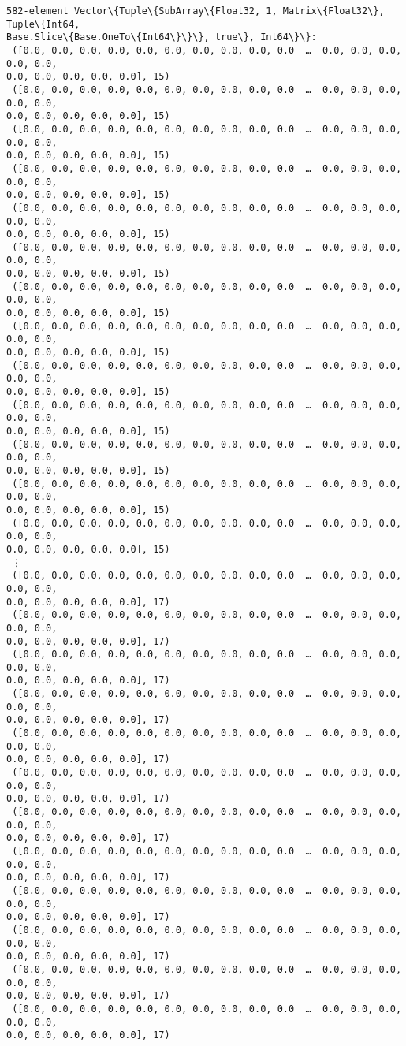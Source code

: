 \documentclass[11pt]{article}
\makeatletter
\newcommand{\boxspacing}{\kern\kvtcb@left@rule\kern\kvtcb@boxsep}
\newcommand{\prompt}[4]{
        {\ttfamily\llap{{\color{#2}[#3]:\hspace{3pt}#4}}\vspace{-\baselineskip}}
    }
\makeatother
\begin{document}
            \begin{tcolorbox}[breakable, size=fbox, boxrule=.5pt, pad at break*=1mm, opacityfill=0]
\prompt{Out}{outcolor}{160}{\boxspacing}
\begin{Verbatim}[commandchars=\\\{\}]
582-element Vector\{Tuple\{SubArray\{Float32, 1, Matrix\{Float32\}, Tuple\{Int64,
Base.Slice\{Base.OneTo\{Int64\}\}\}, true\}, Int64\}\}:
 ([0.0, 0.0, 0.0, 0.0, 0.0, 0.0, 0.0, 0.0, 0.0, 0.0  …  0.0, 0.0, 0.0, 0.0, 0.0,
0.0, 0.0, 0.0, 0.0, 0.0], 15)
 ([0.0, 0.0, 0.0, 0.0, 0.0, 0.0, 0.0, 0.0, 0.0, 0.0  …  0.0, 0.0, 0.0, 0.0, 0.0,
0.0, 0.0, 0.0, 0.0, 0.0], 15)
 ([0.0, 0.0, 0.0, 0.0, 0.0, 0.0, 0.0, 0.0, 0.0, 0.0  …  0.0, 0.0, 0.0, 0.0, 0.0,
0.0, 0.0, 0.0, 0.0, 0.0], 15)
 ([0.0, 0.0, 0.0, 0.0, 0.0, 0.0, 0.0, 0.0, 0.0, 0.0  …  0.0, 0.0, 0.0, 0.0, 0.0,
0.0, 0.0, 0.0, 0.0, 0.0], 15)
 ([0.0, 0.0, 0.0, 0.0, 0.0, 0.0, 0.0, 0.0, 0.0, 0.0  …  0.0, 0.0, 0.0, 0.0, 0.0,
0.0, 0.0, 0.0, 0.0, 0.0], 15)
 ([0.0, 0.0, 0.0, 0.0, 0.0, 0.0, 0.0, 0.0, 0.0, 0.0  …  0.0, 0.0, 0.0, 0.0, 0.0,
0.0, 0.0, 0.0, 0.0, 0.0], 15)
 ([0.0, 0.0, 0.0, 0.0, 0.0, 0.0, 0.0, 0.0, 0.0, 0.0  …  0.0, 0.0, 0.0, 0.0, 0.0,
0.0, 0.0, 0.0, 0.0, 0.0], 15)
 ([0.0, 0.0, 0.0, 0.0, 0.0, 0.0, 0.0, 0.0, 0.0, 0.0  …  0.0, 0.0, 0.0, 0.0, 0.0,
0.0, 0.0, 0.0, 0.0, 0.0], 15)
 ([0.0, 0.0, 0.0, 0.0, 0.0, 0.0, 0.0, 0.0, 0.0, 0.0  …  0.0, 0.0, 0.0, 0.0, 0.0,
0.0, 0.0, 0.0, 0.0, 0.0], 15)
 ([0.0, 0.0, 0.0, 0.0, 0.0, 0.0, 0.0, 0.0, 0.0, 0.0  …  0.0, 0.0, 0.0, 0.0, 0.0,
0.0, 0.0, 0.0, 0.0, 0.0], 15)
 ([0.0, 0.0, 0.0, 0.0, 0.0, 0.0, 0.0, 0.0, 0.0, 0.0  …  0.0, 0.0, 0.0, 0.0, 0.0,
0.0, 0.0, 0.0, 0.0, 0.0], 15)
 ([0.0, 0.0, 0.0, 0.0, 0.0, 0.0, 0.0, 0.0, 0.0, 0.0  …  0.0, 0.0, 0.0, 0.0, 0.0,
0.0, 0.0, 0.0, 0.0, 0.0], 15)
 ([0.0, 0.0, 0.0, 0.0, 0.0, 0.0, 0.0, 0.0, 0.0, 0.0  …  0.0, 0.0, 0.0, 0.0, 0.0,
0.0, 0.0, 0.0, 0.0, 0.0], 15)
 ⋮
 ([0.0, 0.0, 0.0, 0.0, 0.0, 0.0, 0.0, 0.0, 0.0, 0.0  …  0.0, 0.0, 0.0, 0.0, 0.0,
0.0, 0.0, 0.0, 0.0, 0.0], 17)
 ([0.0, 0.0, 0.0, 0.0, 0.0, 0.0, 0.0, 0.0, 0.0, 0.0  …  0.0, 0.0, 0.0, 0.0, 0.0,
0.0, 0.0, 0.0, 0.0, 0.0], 17)
 ([0.0, 0.0, 0.0, 0.0, 0.0, 0.0, 0.0, 0.0, 0.0, 0.0  …  0.0, 0.0, 0.0, 0.0, 0.0,
0.0, 0.0, 0.0, 0.0, 0.0], 17)
 ([0.0, 0.0, 0.0, 0.0, 0.0, 0.0, 0.0, 0.0, 0.0, 0.0  …  0.0, 0.0, 0.0, 0.0, 0.0,
0.0, 0.0, 0.0, 0.0, 0.0], 17)
 ([0.0, 0.0, 0.0, 0.0, 0.0, 0.0, 0.0, 0.0, 0.0, 0.0  …  0.0, 0.0, 0.0, 0.0, 0.0,
0.0, 0.0, 0.0, 0.0, 0.0], 17)
 ([0.0, 0.0, 0.0, 0.0, 0.0, 0.0, 0.0, 0.0, 0.0, 0.0  …  0.0, 0.0, 0.0, 0.0, 0.0,
0.0, 0.0, 0.0, 0.0, 0.0], 17)
 ([0.0, 0.0, 0.0, 0.0, 0.0, 0.0, 0.0, 0.0, 0.0, 0.0  …  0.0, 0.0, 0.0, 0.0, 0.0,
0.0, 0.0, 0.0, 0.0, 0.0], 17)
 ([0.0, 0.0, 0.0, 0.0, 0.0, 0.0, 0.0, 0.0, 0.0, 0.0  …  0.0, 0.0, 0.0, 0.0, 0.0,
0.0, 0.0, 0.0, 0.0, 0.0], 17)
 ([0.0, 0.0, 0.0, 0.0, 0.0, 0.0, 0.0, 0.0, 0.0, 0.0  …  0.0, 0.0, 0.0, 0.0, 0.0,
0.0, 0.0, 0.0, 0.0, 0.0], 17)
 ([0.0, 0.0, 0.0, 0.0, 0.0, 0.0, 0.0, 0.0, 0.0, 0.0  …  0.0, 0.0, 0.0, 0.0, 0.0,
0.0, 0.0, 0.0, 0.0, 0.0], 17)
 ([0.0, 0.0, 0.0, 0.0, 0.0, 0.0, 0.0, 0.0, 0.0, 0.0  …  0.0, 0.0, 0.0, 0.0, 0.0,
0.0, 0.0, 0.0, 0.0, 0.0], 17)
 ([0.0, 0.0, 0.0, 0.0, 0.0, 0.0, 0.0, 0.0, 0.0, 0.0  …  0.0, 0.0, 0.0, 0.0, 0.0,
0.0, 0.0, 0.0, 0.0, 0.0], 17)
\end{Verbatim}
\end{tcolorbox}
        
\end{document}
